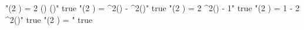 "\sin(2 \alpha) = 2 \sin(\alpha) \cos(\alpha)" true
"\cos(2 \alpha) = \cos^2(\alpha) - \sin^2(\alpha)" true
"\cos(2 \alpha) = 2 \cos^2(\alpha) - 1" true
"\cos(2 \alpha) = 1 - 2 \sin^2(\alpha)" true
"\tan(2 \alpha) = " true
